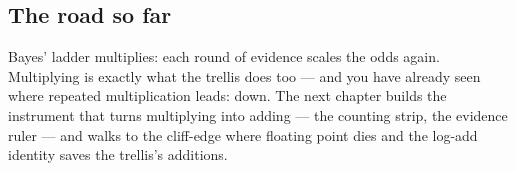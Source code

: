 \cleardoublepage
\begin{narrative}
\section*{The road so far}


\noindent Bayes' ladder multiplies: each round of evidence scales the odds again. Multiplying is exactly what the trellis does too — and you have already seen where repeated multiplication leads: down. The next chapter builds the instrument that turns multiplying into adding — the counting strip, the evidence ruler — and walks to the cliff-edge where floating point dies and the log-add identity saves the trellis's additions.
\end{narrative}
